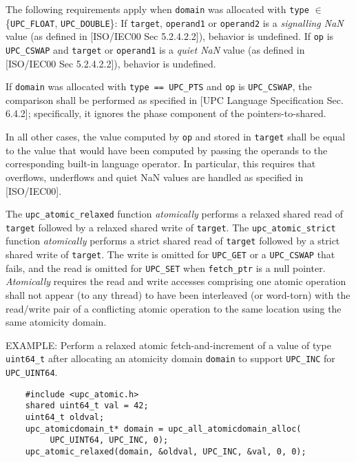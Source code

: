 \np The following requirements apply when {\tt domain} was allocated 
    with {\tt type} $\in$ \{{\tt UPC\_FLOAT}, {\tt UPC\_DOUBLE}\}:
    If {\tt *target}, {\tt *operand1} or {\tt *operand2} is a {\em signalling NaN} value 
    (as defined in [ISO/IEC00 Sec 5.2.4.2.2]), behavior is undefined.
    If {\tt op} is {\tt UPC\_CSWAP} and {\tt *target} or {\tt *operand1} is a {\em quiet NaN} value 
    (as defined in [ISO/IEC00 Sec 5.2.4.2.2]), behavior is undefined.

\np If {\tt domain} was allocated with {\tt type == UPC\_PTS} and {\tt op} is {\tt UPC\_CSWAP},
    the comparison shall be performed as specified in [UPC Language Specification Sec. 6.4.2];
    specifically, it ignores the phase component of the pointers-to-shared.

\np In all other cases, the value computed by {\tt op} and stored in {\tt *target} 
    shall be equal to the value that would have been computed by passing the operands 
    to the corresponding built-in language operator. In particular, this requires that
    overflows, underflows and quiet NaN values are handled as specified in [ISO/IEC00].

\np The {\tt upc\_atomic\_relaxed} function {\em atomically} performs a relaxed shared read of {\tt *target} 
    followed by a relaxed shared write of {\tt *target}. 
    The {\tt upc\_atomic\_strict} function {\em atomically} performs a strict shared read of {\tt *target} 
    followed by a strict shared write of {\tt *target}. The write is omitted for {\tt UPC\_GET} 
    or a {\tt UPC\_CSWAP} that fails, 
    and the read is omitted for {\tt UPC\_SET} when {\tt fetch\_ptr} is a null pointer.
    {\em Atomically} requires the read and write accesses comprising one atomic operation shall not appear (to any thread) 
    to have been interleaved (or word-torn) with the read/write pair of a conflicting atomic operation to the same location
    using the same atomicity domain.

\np EXAMPLE: Perform a relaxed atomic fetch-and-increment of a value of type
    {\tt uint64\_t} after allocating an atomicity domain {\tt domain} to
    support {\tt UPC\_INC} for {\tt UPC\_UINT64}.
\begin{verbatim}
    #include <upc_atomic.h>
    shared uint64_t val = 42;
    uint64_t oldval;
    upc_atomicdomain_t* domain = upc_all_atomicdomain_alloc(
         UPC_UINT64, UPC_INC, 0);
    upc_atomic_relaxed(domain, &oldval, UPC_INC, &val, 0, 0);
\end{verbatim}
\vfill

